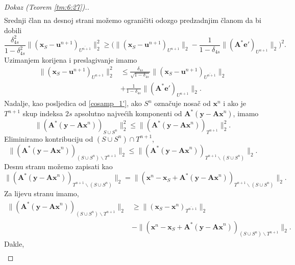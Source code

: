 \documentclass[a4paper,twoside,12pt]{memoir} %
\newcommand{\vect}[1]{\mathbf{#1}}
\renewcommand{\vec}{\vect}
\newcommand{\norm}[1]{\|{#1}\|}
\begin{document}
\begin{proof}[Dokaz (Teorem \ref{tm:6:27}).]
\begin{align*}
    \end{align*}
    Srednji \v{c}lan na desnoj strani mo\v{z}emo ograni\v{c}iti odozgo predzadnjim \v{c}lanom da bi dobili
    \begin{equation*}
        \frac{\delta_{4s}^2}{1-\delta_{4s}^2} \norm{(\vec x_S - \vec u^{n+1})_{\overline{U^{n+1}}}}_2^2 \geq \big( \norm{(\vec x_S - \vec u^{n+1})_{U^{n+1}}}_2 - \frac{1}{1-\delta_{4s}} \norm{(\vec A^* \vec e')_{U^{n+1}}}_2  \big)^2. 
    \end{equation*}
    Uzimanjem korijena i preslagivanje imamo
    \begin{align}
        \norm{(\vec x_S - \vec u^{n+1})_{U^{n+1}}}_2^2 & \leq \frac{\delta_{4s}}{\sqrt{1-\delta_{4s}}}  \norm{(\vec x_S - \vec u^{n+1})_{\overline{U^{n+1}}}}_2 \nonumber \\[0.5em]
        & + \frac{1}{1-\delta_{4s}} \norm{(\vec A^* \vec e')_{U^{n+1}}}_2.\label{6:50} 
    \end{align}
    Nadalje, kao posljedica od \eqref{cosamp_1'}, ako $S^n$ ozna\v{c}uje nosa\v{c} od $\vec x^n$ i ako je $T^{n+1}$ skup indeksa $2s$ apsolutno najve\'cih komponenti od $\vec A^*(\vec y - \vec{Ax}^n)$, imamo
    \begin{equation*}
        \norm{(\vec A^*(\vec y - \vec {Ax}^n))_{S \cup S^n}}_2^2 \leq \norm{(\vec A^*(\vec y - \vec{Ax}^n))_{T^{n+1}}}_2^2.
    \end{equation*}
    Eliminiramo kontribuciju od $(S \cup S^n) \cap T^{n+1}$,
    \begin{equation*}
        \norm{(\vec A^*(\vec y - \vec{Ax}^n))_{(S \cup S^n) \backslash T^{n+1}}}_2 \leq \norm{(\vec A^*(\vec y - \vec {Ax}^n))_{T^{n+1} \backslash (S \cup S^n)}}_2.
    \end{equation*}
    Desnu stranu mo\v{z}emo zapisati kao
    \begin{equation*}
        \norm{(\vec A^*(\vec y - \vec {Ax}^n))_{T^{n+1} \backslash (S \cup S^n)}}_2 = \norm{(\vec x^n - \vec x_S + \vec A^*(\vec y - \vec {Ax}^n))_{T^{n+1} \backslash (S \cup S^n)}}_2.
    \end{equation*}
    Za lijevu stranu imamo,
    \begin{align*}
        \norm{(\vec A^*(\vec y - \vec{Ax}^n))_{(S \cup S^n) \backslash T^{n+1}}}_2 & \geq \norm{(\vec x_S - \vec x^n)_{\overline{T^{n+1}}}}_2\\[0.5em]
        & - \norm{(\vec x^n - \vec x_S + \vec A^*(\vec y - \vec {Ax}^n))_{(S \cup S^n) \backslash T^{n+1}}}_2.
    \end{align*}
    Dakle,
    \begin{align*}

\end{align*}
\end{proof}
\end{document}
